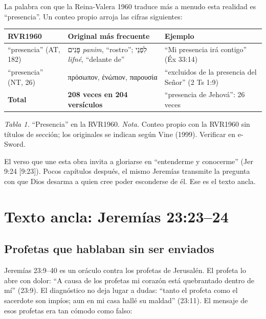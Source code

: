 \documentclass[11pt,letterpaper]{article}
\newcommand{\heb}[1]{\mbox{\foreignlanguage{hebrew}{#1}}}
\newcommand{\grc}[1]{\foreignlanguage{ancientgreek}{#1}}
\begin{document}
La palabra con que la Reina-Valera 1960 traduce más a menudo esta realidad es ``presencia''. Un conteo propio arroja las cifras siguientes:

\begin{center}\small\renewcommand{\arraystretch}{1.18}
\begin{tabular}{@{}L{3.2cm}L{5.0cm}L{5.8cm}@{}}
\toprule
\textbf{RVR1960} & \textbf{Original más frecuente} & \textbf{Ejemplo} \\ \midrule
``presencia'' (AT, 182) & \heb{פָּנִים} \emph{panim}, ``rostro''; \heb{לִפְנֵי} \emph{lifné}, ``delante de'' & ``Mi presencia irá contigo'' (Éx 33:14) \\
``presencia'' (NT, 26) & \grc{πρόσωπον}, \grc{ἐνώπιον}, \grc{παρουσία} & ``excluidos de la presencia del Señor'' (2 Ts 1:9) \\ \midrule
\textbf{Total} & \textbf{208 veces en 204 versículos} & ``presencia de Jehová'': 26 veces \\
\bottomrule
\end{tabular}\par
{\footnotesize\color{gris}\textit{Tabla 1.} ``Presencia'' en la RVR1960. \textit{Nota.} Conteo propio con la RVR1960 sin títulos de sección; los originales se indican según Vine (1999). Verificar en e-Sword.}
\end{center}

El verso que une esta obra invita a gloriarse en ``entenderme y conocerme'' (Jer 9:24 [9:23]). Pocos capítulos después, el mismo Jeremías transmite la pregunta con que Dios desarma a quien cree poder esconderse de él. Ese es el texto ancla.

\section{Texto ancla: Jeremías 23:23--24}

\subsection{Profetas que hablaban sin ser enviados}

Jeremías 23:9--40 es un oráculo contra los profetas de Jerusalén. El profeta lo abre con dolor: ``A causa de los profetas mi corazón está quebrantado dentro de mí'' (23:9). El diagnóstico no deja lugar a dudas: ``tanto el profeta como el sacerdote son impíos; aun en mi casa hallé su maldad'' (23:11). El mensaje de esos profetas era tan cómodo como falso:
\end{document}
